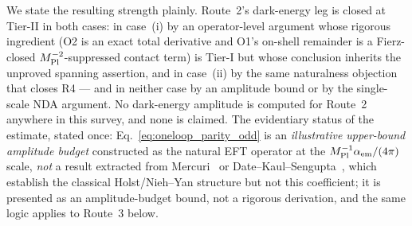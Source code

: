 \documentclass[aps,prd,twocolumn,superscriptaddress,showpacs,preprintnumbers,nofootinbib,longbibliography,floatfix]{revtex4-2}
\newcommand{\MPl}{M_{\rm Pl}}
\begin{document}
We state the resulting strength plainly. Route~2's dark-energy leg is
closed at Tier-II in both cases: in case~(i) by an operator-level
argument whose rigorous ingredient (O2 is an exact total derivative and
O1's on-shell remainder is a Fierz-closed $\MPl^{-2}$-suppressed contact
term) is Tier-I but whose conclusion inherits the unproved
spanning assertion, and in case~(ii) by the same naturalness objection
that closes R4 --- and in neither case by an amplitude bound or by the
single-scale NDA argument. No dark-energy amplitude is computed for
Route~2 anywhere in this survey, and none is claimed.
The evidentiary status of the estimate, stated once: Eq.~\eqref{eq:oneloop_parity_odd} is an \emph{illustrative
upper-bound amplitude budget} constructed as the natural EFT operator at the
$M_{\rm Pl}^{-1}\alpha_{\rm em}/(4\pi)$ scale, \emph{not} a result extracted from
Mercuri~\cite{Mercuri2009} or Date--Kaul--Sengupta~\cite{DateKaulSengupta2009},
which establish the classical Holst/Nieh--Yan structure but not this
coefficient; it is presented as an amplitude-budget bound, not a rigorous
derivation, and the same logic applies to Route~3 below.
\end{document}
